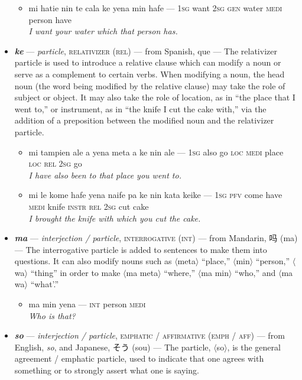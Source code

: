 \documentclass[a4paper]{article}
\begin{document}
\begin{itemize}
	\begin{itemize}
		\item mi hatie nin te cala ke yena min hafe — \textsc{1sg} want \textsc{2sg gen} water \textsc{medi} person have \\\textit{I want your water which that person has.}
	\end{itemize}
	\item \textbf{\textit{ke}} —  \textit{particle}, \textsc{relativizer (rel)} — from Spanish, que — The relativizer particle is used to introduce a relative clause which can modify a noun or serve as a complement to certain verbs. When modifying a noun, the head noun (the word being modified by the relative clause) may take the role of subject or object. It may also take the role of location, as in ``the place that I went to,'' or instrument, as in ``the knife I cut the cake with,'' via the addition of a preposition between the modified noun and the relativizer particle.
	\begin{itemize}
		\item mi tampien ale a yena meta a ke nin ale — \textsc{1sg} also go \textsc{loc medi} place \textsc{loc rel 2sg} go \\\textit{I have also been to that place you went to.}
		\item mi le kome hafe yena naife pa ke nin kata keike — \textsc{1sg pfv} come have \textsc{medi} knife \textsc{instr rel 2sg} cut cake \\\textit{I brought the knife with which you cut the cake.}
	\end{itemize}
	\item \textbf{\textit{ma}} —  \textit{interjection / particle}, \textsc{interrogative (int)} — from Mandarin, 吗 (ma) — The interrogative particle is added to sentences to make them into questions. It can also modify nouns such as $\langle$meta$\rangle$ ``place,'' $\langle$min$\rangle$ ``person,'' $\langle$wa$\rangle$ ``thing'' in order to make $\langle$ma meta$\rangle$ ``where,'' $\langle$ma min$\rangle$ ``who,'' and $\langle$ma wa$\rangle$ ``what'.''
	\begin{itemize}
		\item ma min yena — \textsc{int} person \textsc{medi} \\\textit{Who is that?}
	\end{itemize}
	\item \textbf{\textit{so}} — \textit{interjection / particle}, \textsc{emphatic / affirmative (emph / aff)} — from English, \textit{so}, and Japanese, そう (sou) — The particle, $\langle$so$\rangle$, is the general agreement / emphatic particle, used to indicate that one agrees with something or to strongly assert what one is saying.

\end{itemize}
\end{document}
